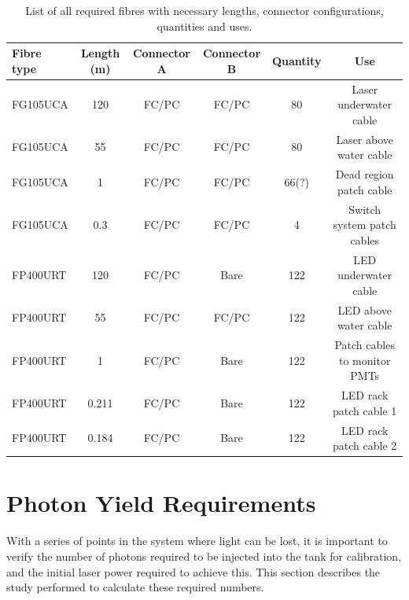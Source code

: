 \documentclass[a4paper,11pt]{article}
\begin{document}
\begin{table}[h]
\centering
\setlength{\tabcolsep}{4pt}
\begin{tabular}{lccccc}
\hline
Fibre type & Length (m) & Connector A & Connector B & Quantity & Use \\ \hline
FG105UCA   &  120   &   FC/PC     &  FC/PC      &    80  & Laser underwater cable  \\
FG105UCA   &   55   &   FC/PC     &  FC/PC      &    80  & Laser above water cable    \\
FG105UCA   &    1   &   FC/PC     &  FC/PC      &    66{\color{red}(?)} &  Dead region patch cable \\
FG105UCA   &  0.3   &   FC/PC     &  FC/PC      &   4  & Switch system patch cables \\
FP400URT   &  120   &   FC/PC     &  Bare       & 122  & LED underwater cable   \\
FP400URT   &   55   &   FC/PC     &  FC/PC      & 122   & LED above water cable   \\
FP400URT   &    1   &   FC/PC     &  Bare       & 122   & Patch cables to monitor PMTs  \\ 
FP400URT   &  0.211   &   FC/PC    &  Bare       & 122   & LED rack patch cable 1  \\ 
FP400URT   &   0.184   &   FC/PC     &  Bare       & 122  & LED rack patch cable 2  \\ 
\hline
\end{tabular}
\caption{List of all required fibres with necessary lengths, connector configurations, quantities and uses.}\label{tab:fibrelengths}
\end{table}

\clearpage

\section{Photon Yield Requirements}

With a series of points in the system where light can be lost, it is important to verify the number of photons required to be injected into the tank for calibration, and the initial laser power required to achieve this. This section describes the study performed to calculate these required numbers.
\end{document}
